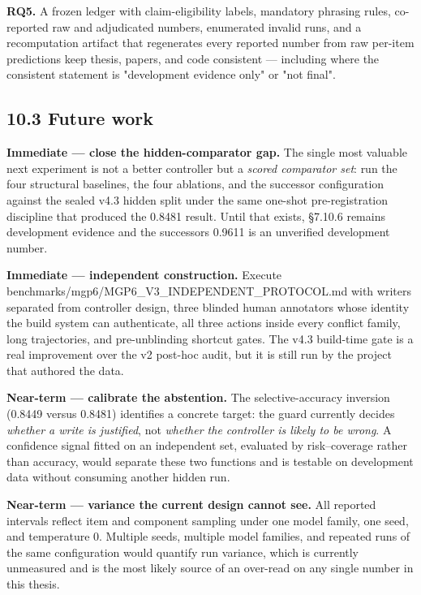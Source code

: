 \textbf{RQ5.} A frozen ledger with claim-eligibility labels, mandatory
phrasing rules, co-reported raw and adjudicated numbers, enumerated
invalid runs, and a recomputation artifact that regenerates every
reported number from raw per-item predictions keep thesis, papers, and
code consistent --- including where the consistent statement is
"development evidence only" or "not final".

\subsection{10.3 Future work}\label{future-work}

\textbf{Immediate --- close the hidden-comparator gap.} The single most
valuable next experiment is not a better controller but a \emph{scored
comparator set}: run the four structural baselines, the four ablations,
and the successor configuration against the sealed v4.3 hidden split
under the same one-shot pre-registration discipline that produced the
0.8481 result. Until that exists, §7.10.6 remains development evidence
and the successor\textquotesingle s 0.9611 is an unverified development
number.

\textbf{Immediate --- independent construction.} Execute
benchmarks/mgp6/MGP6\_V3\_INDEPENDENT\_PROTOCOL.md with writers
separated from controller design, three blinded human annotators whose
identity the build system can authenticate, all three actions inside
every conflict family, long trajectories, and pre-unblinding shortcut
gates. The v4.3 build-time gate is a real improvement over the v2
post-hoc audit, but it is still run by the project that authored the
data.

\textbf{Near-term --- calibrate the abstention.} The selective-accuracy
inversion (0.8449 versus 0.8481) identifies a concrete target: the guard
currently decides \emph{whether a write is justified}, not \emph{whether
the controller is likely to be wrong}. A confidence signal fitted on an
independent set, evaluated by risk--coverage rather than accuracy, would
separate these two functions and is testable on development data without
consuming another hidden run.

\textbf{Near-term --- variance the current design cannot see.} All
reported intervals reflect item and component sampling under one model
family, one seed, and temperature 0. Multiple seeds, multiple model
families, and repeated runs of the same configuration would quantify run
variance, which is currently unmeasured and is the most likely source of
an over-read on any single number in this thesis.

